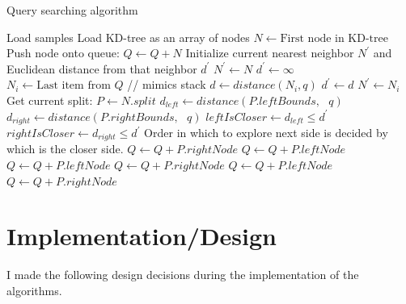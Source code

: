 \documentclass[11pt]{amsart}
\begin{document}
\begin{algorithm}
\caption{Query searching algorithm}
\label{query_searching}
\begin{algorithmic}[1]
\State Load samples
\State Load KD-tree as an array of nodes
\State
{}
\State $N \gets \text{First node in KD-tree}$
\State Push node onto queue: $Q \gets Q + N$
\State
\State Initialize current nearest neighbor $N^\prime$ and Euclidean distance from that neighbor $d^\prime$
\State $N^\prime \gets N$
\State $d^\prime \gets \infty$
\State
{}
\State $N_i \gets \text{Last item from } Q$ \hspace{0.5in}// mimics stack
\State $d \gets distance(N_i, q)$
\State $d^\prime \gets d$
\State $N^\prime \gets N_i$
\EndIf
\Else
\State Get current split: $P \gets N.split$
\State $d_{left} \gets distance(P.leftBounds,\text{ } q)$ 
\State $d_{right} \gets distance(P.rightBounds,\text{ } q)$ 
\State
\State $leftIsCloser \gets d_{left} \leq d^\prime$ 
\State $rightIsCloser \gets d_{right}  \leq d^\prime$ 
\State
{} 
\State Order in which to explore next side is decided by which is the closer side.
\State $Q \gets Q + P.rightNode$
\State $Q \gets Q + P.leftNode$
\Else
\State $Q \gets Q + P.leftNode$
\State $Q \gets Q + P.rightNode$
\EndIf
{} 
\State $Q \gets Q + P.leftNode$
\State $Q \gets Q + P.rightNode$
\EndIf
\EndIf
\EndWhile
\EndProcedure
\end{algorithmic}
\end{algorithm}


\section{Implementation/Design}

I made the following design decisions during the implementation of the algorithms.
\



 
 
\end{document}
